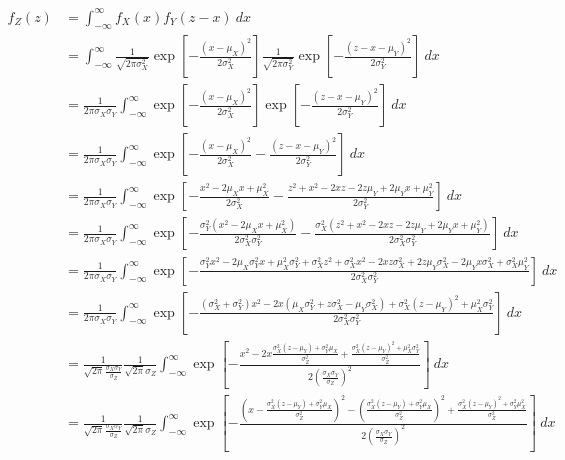 \documentclass{article}
\begin{document}
{
  \allowdisplaybreaks
\begin{align*}
  f_Z(z) &= \int_{-\infty}^{\infty} f_X(x) f_Y(z - x) \: dx \\
  &= \int_{-\infty}^{\infty} \frac{1}{\sqrt{2 \pi \sigma_X^2}} \exp \left[{-\frac{(x - \mu_X)^2}{2 \sigma_X^2}} \right] \frac{1}{\sqrt{2 \pi \sigma_Y^2}} \exp \left[{-\frac{(z - x - \mu_Y)^2}{2 \sigma_Y^2}} \right] \: dx \\[10pt]
  &= \frac{1}{2 \pi \sigma_X \sigma_Y} \int_{-\infty}^{\infty} \exp \left[{-\frac{(x - \mu_X)^2}{2 \sigma_X^2}} \right] \exp \left[{-\frac{(z - x - \mu_Y)^2}{2 \sigma_Y^2}} \right] \: dx \\[10pt]
  &= \frac{1}{2 \pi \sigma_X \sigma_Y} \int_{-\infty}^{\infty} \exp\left[{-\frac{(x - \mu_X)^2}{2 \sigma_X^2} - \frac{(z - x - \mu_Y)^2}{2 \sigma_Y^2}} \right] \: dx \\[10pt]
  &= \frac{1}{2 \pi \sigma_X \sigma_Y} \int_{-\infty}^{\infty} \exp\left[{-\frac{x^2 - 2 \mu_X x + \mu_X^2}{2 \sigma_X^2} - \frac{z^2 + x^2 - 2 x z - 2 z \mu_Y + 2 \mu_Y x + \mu_Y^2}{2 \sigma_Y^2}} \right] \: dx \\[10pt]
  &= \frac{1}{2 \pi \sigma_X \sigma_Y} \int_{-\infty}^{\infty} \exp\left[{-\frac{\sigma_Y^2(x^2 - 2 \mu_X x + \mu_X^2)}{2 \sigma_X^2 \sigma_Y^2} - \frac{\sigma_X^2(z^2 + x^2 - 2 x z - 2 z \mu_Y + 2 \mu_Y x + \mu_Y^2)}{2 \sigma_X^2 \sigma_Y^2 }} \right] \: dx \\[10pt]
  &= \frac{1}{2 \pi \sigma_X \sigma_Y} \int_{-\infty}^{\infty} \exp\left[{-\frac{\sigma_Y^2 x^2 - 2 \mu_X \sigma_Y^2 x + \mu_X^2 \sigma_Y^2 + \sigma_X^2 z^2 + \sigma_X^2 x^2 - 2xz\sigma_X^2 + 2 z \mu_Y \sigma_X^2 - 2\mu_Y x \sigma_X^2 + \sigma_X^2 \mu_Y^2}{2 \sigma_X^2 \sigma_Y^2}} \right] \: dx \\[10pt]
  &= \frac{1}{2 \pi \sigma_X \sigma_Y} \int_{-\infty}^{\infty} \exp\left[{-\frac{\left(\sigma_X^2 + \sigma_Y^2\right) x^2 - 2 x \left( \mu_X \sigma_Y^2 + z \sigma_X^2 - \mu_Y \sigma_X^2 \right) + \sigma_X^2 \left( z - \mu_Y \right)^2 + \mu_X^2 \sigma_Y^2}{2 \sigma_X^2 \sigma_Y^2}} \right] \: dx \\[10pt]
  &= \frac{1}{\sqrt{2 \pi} \frac{\sigma_X \sigma_Y}{\sigma_Z}} \frac{1}{\sqrt{2 \pi} \sigma_Z} \int_{-\infty}^{\infty} \exp\left[{-\frac{x^2 - 2x \frac{\sigma_X^2 (z - \mu_Y) + \sigma_Y^2 \mu_X}{\sigma_Z^2} + \frac{\sigma_X^2 \left( z - \mu_Y \right)^2 + \mu_X^2 \sigma_Y^2}{\sigma_Z^2}}{2 \left(\frac{\sigma_X \sigma_Y}{\sigma_Z}\right)^2}} \right] \: dx \\[10pt]
  &= \frac{1}{\sqrt{2 \pi} \frac{\sigma_X \sigma_Y}{\sigma_Z}} \frac{1}{\sqrt{2 \pi} \sigma_Z} \int_{-\infty}^{\infty} \exp\left[{-\frac{\left( x - \frac{\sigma_X^2 (z - \mu_Y) + \sigma_Y^2 \mu_X}{\sigma_Z^2}\right)^2 - \left( \frac{\sigma_X^2 (z - \mu_Y) + \sigma_Y^2 \mu_X}{\sigma_Z^2} \right)^2 + \frac{\sigma_X^2 (z - \mu_Y)^2 + \sigma_Y^2 \mu_X^2}{\sigma_Z^2}}{2 \left(\frac{\sigma_X \sigma_Y}{\sigma_Z}\right)^2}} \right] \: dx  \\[10pt]

\end{align*}}
\end{document}
